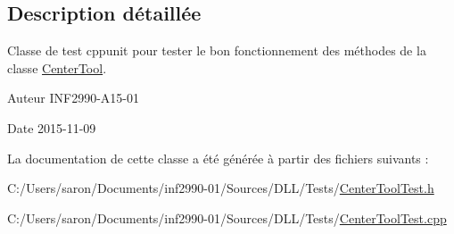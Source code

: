 \subsection{Description détaillée}
Classe de test cppunit pour tester le bon fonctionnement des méthodes de la classe \hyperlink{class_center_tool}{Center\-Tool}. 

\begin{DoxyAuthor}{Auteur}
I\-N\-F2990-\/\-A15-\/01 
\end{DoxyAuthor}
\begin{DoxyDate}{Date}
2015-\/11-\/09 
\end{DoxyDate}


La documentation de cette classe a été générée à partir des fichiers suivants \-:\begin{DoxyCompactItemize}
\item 
C\-:/\-Users/saron/\-Documents/inf2990-\/01/\-Sources/\-D\-L\-L/\-Tests/\hyperlink{_center_tool_test_8h}{Center\-Tool\-Test.\-h}\item 
C\-:/\-Users/saron/\-Documents/inf2990-\/01/\-Sources/\-D\-L\-L/\-Tests/\hyperlink{_center_tool_test_8cpp}{Center\-Tool\-Test.\-cpp}\end{DoxyCompactItemize}
